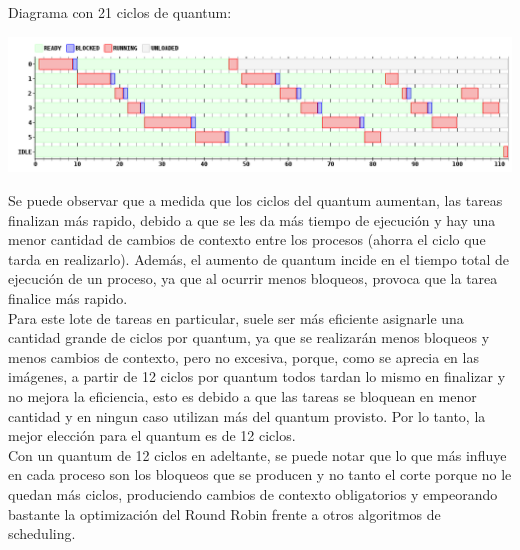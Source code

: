 \par Diagrama con 21 ciclos de quantum:
\begin {center}
\includegraphics[width=16cm]{../simusched/outputs/ej7/rr-ej7-1-21.png}
\end {center}

Se puede observar que a medida que los ciclos del quantum aumentan, las tareas finalizan más rapido, debido a que se les da más tiempo de ejecución y hay una menor cantidad de cambios de contexto entre los procesos (ahorra el ciclo que tarda en realizarlo). Además, el aumento de quantum incide en el tiempo total de ejecución de un proceso, ya que al ocurrir menos bloqueos, provoca que la tarea finalice más rapido.
\\
Para este lote de tareas en particular, suele ser más eficiente asignarle una cantidad grande de ciclos por quantum,  ya que se realizarán menos bloqueos y menos cambios de contexto, pero no excesiva, porque, como se aprecia en las imágenes, a partir de 12 ciclos por quantum todos tardan lo mismo en finalizar y no mejora la eficiencia, esto es debido a que las tareas se bloquean en menor cantidad y en ningun caso utilizan más del quantum provisto. Por lo tanto, la mejor elección para el quantum es de 12 ciclos.
\\
Con un quantum de 12 ciclos en adeltante, se puede notar que lo que más influye en cada proceso son los bloqueos que se producen y no tanto el corte porque no le quedan más ciclos, produciendo cambios de contexto obligatorios y empeorando bastante la optimización del Round Robin frente a otros algoritmos de scheduling.


